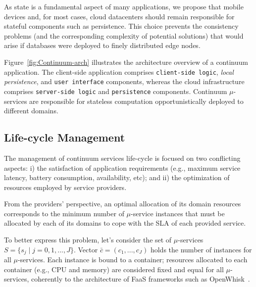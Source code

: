As state is a fundamental aspect of many applications, we propose that mobile devices and, for most cases, cloud datacenters should remain responsible for stateful components such as persistence. This choice prevents the consistency problems (and the corresponding complexity of potential solutions) that would arise if databases were deployed to finely distributed edge nodes. %

Figure~\ref{fig:Continuum-arch} illustrates the architecture overview of a continuum application. The client-side application comprises \texttt{client-side logic}, \textit{local persistence}, and \texttt{user interface} components, whereas the cloud infrastructure comprises \texttt{server-side logic} and \texttt{persistence} components. Continuum $\mu$-services are responsible for stateless computation opportunistically deployed to different domains.

\subsection{Life-cycle Management}

The management of continuum services life-cycle is focused on two conflicting aspects: i) the satisfaction of application requirements (e.g., maximum service latency, battery consumption, availability, etc); and ii) the optimization of resources employed by service providers. 

From the providers' perspective, an optimal allocation of its domain resources corresponds to the minimum number of $\mu$-service instances that must be allocated by each of its domains to cope with the SLA of each provided service.%

To better express this problem, let's consider the set of $\mu$-services $S = \{s_j \mid j = 0,1,...,J\}$.
Vector $\bar{c} = (c_1, ..., c_J)$ holds the number of instances for all $\mu$-services. Each instance is bound to a container; resources allocated to each container 
(e.g., CPU and memory) are considered fixed and equal for all $\mu$-services, coherently to the architecture of FaaS frameworks such as OpenWhisk~\cite{OpenWhisk}.

